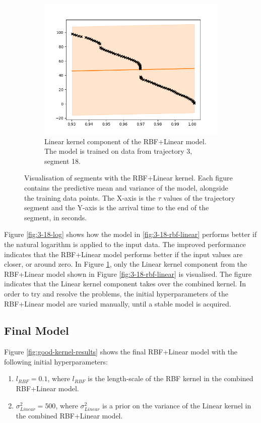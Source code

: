 \begin{figure}
\begin{subfigure}[b]{0.475\textwidth}
        \includegraphics[width=\textwidth]{figures/forecasting/gp_3_18_linear}
        \caption[Linear kernel component of the RBF+Linear model.]%
        {{\small Linear kernel component of the RBF+Linear model. 
        The model is trained on data from trajectory 3, segment 18.
        }}
        \label{fig:3-18-linear}
    \end{subfigure}
    \caption[ Visualisation of arbitrary segments with the RBF+Linear kernel ]
    {{\small Visualisation of segments with the RBF+Linear kernel.
    Each figure contains the predictive mean and variance of the model, alongside the training data points.  
    The X-axis is the $\tau$ values of the trajectory segment and the Y-axis is the arrival time to the end of the segment, in seconds.}} 
    \label{fig:3-18-variations}
\end{figure}

Figure \ref{fig:3-18-log} shows how the model in \ref{fig:3-18-rbf-linear} performs better if the natural logarithm is applied to the input data.
The improved performance indicates that the RBF+Linear model performs better if the input values are closer, or around zero.
In Figure \ref{fig:3-18-linear}, only the Linear kernel component from the RBF+Linear model shown in Figure \ref{fig:3-18-rbf-linear} is visualised.
The figure indicates that the Linear kernel component takes over the combined kernel.
In order to try and resolve the problems, the initial hyperparameters of the RBF+Linear model are varied manually, until a stable model is acquired.

\subsection{Final Model}
Figure \ref{fig:good-kernel-results} shows the final RBF+Linear model with the following initial hyperparameters:
\begin{enumerate}
    \item $l_{RBF}=0.1$, where $l_{RBF}$ is the length-scale of the RBF kernel in the combined RBF+Linear model.
    \item $\sigma_{Linear}^2=500$, where $\sigma_{Linear}^2$ is a prior on the variance of the Linear kernel in the combined RBF+Linear model.
\end{enumerate}

